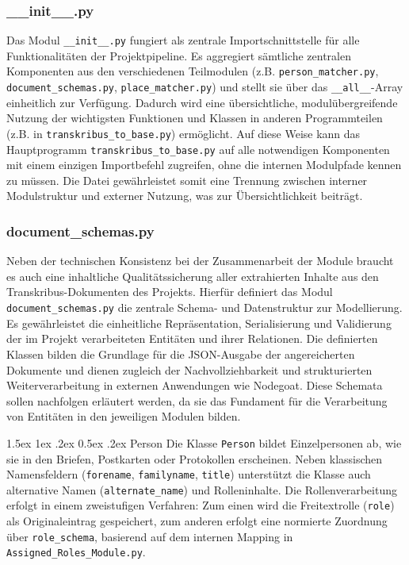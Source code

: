 \documentclass[12pt, a4paper, ngerman, bidi=default]{article}
\makeatletter
\newcommand{\code}[1]{\colorbox{VeryLightGray}{\texttt{#1}}} %
\let\oldparagraph\paragraph%
\renewcommand{\paragraph}{
    \@ifstar%
      \xxxParagraphStar%
      \xxxParagraphNoStar%
 }
\newcommand{\xxxParagraphStar}[1]{\oldparagraph*{#1}\mbox{}}
\newcommand{\xxxParagraphNoStar}[1]{\oldparagraph{#1}\mbox{}}
\renewcommand\paragraph{\@startsection{paragraph}{4}{0em}%
  {1.5ex \@plus1ex \@minus.2ex}%
  {0.5ex \@plus.2ex}%
  {\normalfont\normalsize\bfseries\itshape}}
\makeatother
\begin{document}
\subsubsection{\_\_init\_\_.py}\label{subsec:init_module}
Das Modul \code{\_\_init\_\_.py} fungiert als zentrale Importschnittstelle für alle Funktionalitäten der Projektpipeline. Es aggregiert sämtliche zentralen Komponenten aus den verschiedenen Teilmodulen (z.B. \code{person\_matcher.py}, \code{document\_schemas.py}, \code{place\_matcher.py}) und stellt sie über das \code{\_\_all\_\_}-Array einheitlich zur Verfügung. Dadurch wird eine übersichtliche, modulübergreifende Nutzung der wichtigsten Funktionen und Klassen in anderen Programmteilen (z.B. in \code{transkribus\_to\_base.py}) ermöglicht.
Auf diese Weise kann das Hauptprogramm \code{transkribus\_to\_base.py} auf alle notwendigen Komponenten mit einem einzigen Importbefehl zugreifen, ohne die internen Modulpfade kennen zu müssen. Die Datei gewährleistet somit eine  Trennung zwischen interner Modulstruktur und externer Nutzung, was zur Übersichtlichkeit beiträgt. 

\subsubsection{document\_schemas.py}\label{subsec:document_schema}
Neben der technischen Konsistenz bei der Zusammenarbeit der Module braucht es auch eine inhaltliche Qualitätssicherung aller extrahierten Inhalte aus den Transkribus-Dokumenten des Projekts. Hierfür definiert das Modul \code{document\_schemas.py} die zentrale Schema- und Datenstruktur 
zur Modellierung. Es gewährleistet die einheitliche Repräsentation, 
Serialisierung und Validierung der im Projekt verarbeiteten Entitäten und ihrer Relationen. Die definierten Klassen bilden die Grundlage für die JSON-Ausgabe der angereicherten Dokumente und dienen zugleich der Nachvollziehbarkeit und strukturierten Weiterverarbeitung in externen Anwendungen wie Nodegoat. Diese Schemata sollen nachfolgen erläutert werden, da sie das Fundament für die Verarbeitung von Entitäten in den jeweiligen Modulen bilden.

\paragraph{Person}
Die Klasse \code{Person} bildet Einzelpersonen ab, wie sie in den Briefen, Postkarten oder Protokollen erscheinen. 
Neben klassischen Namensfeldern (\code{forename}, \code{familyname}, \code{title}) unterstützt die Klasse auch 
alternative Namen (\code{alternate\_name}) und Rolleninhalte. Die Rollenverarbeitung erfolgt in einem zweistufigen Verfahren:
Zum einen wird die Freitextrolle (\code{role}) als Originaleintrag gespeichert, zum anderen erfolgt eine normierte 
Zuordnung über \code{role\_schema}, basierend auf dem internen Mapping in \code{Assigned\_Roles\_Module.py}. 
\end{document}
